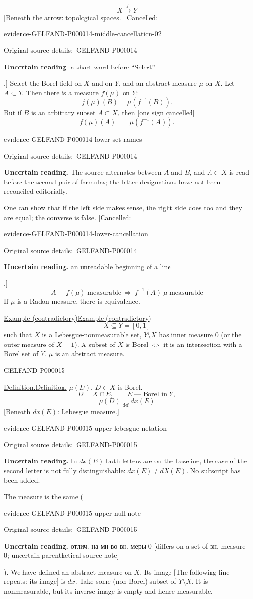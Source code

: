 \documentclass[11pt]{article}
\let\MathUnderline\underline
\renewcommand{\underline}[1]{\ifmmode\MathUnderline{#1}\else\uline{#1}\fi}
\newcommand{\SourcePage}[2]{\par\smallskip\phantomsection\label{#1:source-page}{\small\sffamily\color{blue!55!black}#1}\par\smallskip}
\newcommand{\EvidenceBlock}[4]{%
 \par\smallskip\noindent\begin{minipage}{\linewidth}
 \begin{minipage}[t]{.47\linewidth}\vspace{0pt}\centering
 \csname evidence-#1-#2\endcsname\par
 {\scriptsize\SourceCropCaption\ #1}\par
 \end{minipage}\hfill
 \begin{minipage}[t]{.49\linewidth}\vspace{0pt}\raggedright
 {\small\color{orange!65!black}\textbf{#4} #3}\par
 \end{minipage}
 \end{minipage}\par\smallskip}
\newcommand{\Unclear}[3]{\EvidenceBlock{#1}{#2}{#3}{\ReadingCaption}}
\newcommand{\SourceCropCaption}{Original source details:}\newcommand{\ReadingCaption}{Uncertain reading.}\newcommand{\IncompleteCaption}{Undeciphered passage.}\newcommand{\DiagramCaption}{Diagram and typed description.}
\begin{document}
\begin{equation*}
X\overset f\longrightarrow Y
\end{equation*}
[Beneath the arrow: topological spaces.]
[Cancelled: \Unclear{GELFAND-P000014}{middle-cancellation-02}{a short word before “Select”}.]
Select the Borel field on $X$ and on $Y$, and an abstract measure $\mu$ on $X$.
Let $A\subset Y$.
Then there is a measure $f(\mu)$ on $Y$:
\begin{equation*}
f(\mu)(B)=\mu(f^{-1}(B)).
\end{equation*}
But if $B$ is an arbitrary subset $A\subset X$, then [one sign cancelled]
\begin{equation*}
f(\mu)(A)\qquad \mu(f^{-1}(A)).
\end{equation*}
\Unclear{GELFAND-P000014}{lower-set-names}{The source alternates between $A$ and $B$, and $A\subset X$ is read before the second pair of formulas; the letter designations have not been reconciled editorially.}
One can show that if the left side makes sense, the right side does too and they are equal; the converse is false.
[Cancelled: \Unclear{GELFAND-P000014}{lower-cancellation}{an unreadable beginning of a line}.]
\begin{equation*}
A\ \text{---}\ f(\mu)\text{-measurable}\ \Longrightarrow\ f^{-1}(A)\ \mu\text{-measurable}
\end{equation*}
If $\mu$ is a Radon measure, there is equivalence.

\underline{Example (contradictory)}
\begin{equation*}
X\subseteq Y=[0,1]
\end{equation*}
such that $X$ is a Lebesgue-nonmeasurable set,
$Y\setminus X$ has inner measure $0$ (or the outer measure of $X=1$).
A subset of $X$ is Borel $\Longleftrightarrow$ it is an intersection with a Borel set of $Y$.
$\mu$ is an abstract measure.


\SourcePage{GELFAND-P000015}{8}
\underline{Definition.} $\mu(D)$.
$D\subset X$ is Borel.
\begin{equation*}
D=X\cap E,\qquad E\ \text{--- Borel in }Y,
\end{equation*}
\begin{equation*}
\mu(D)\underset{\mathrm{def}}=dx(E)
\end{equation*}
[Beneath $dx(E)$: Lebesgue measure.]
\Unclear{GELFAND-P000015}{upper-lebesgue-notation}{In $dx(E)$ both letters are on the baseline; the case of the second letter is not fully distinguishable: $dx(E)$ / $dX(E)$. No subscript has been added.}
The measure is the same (\Unclear{GELFAND-P000015}{upper-null-note}{отлич. на мн-во вн. меры 0 [differs on a set of вн. measure 0; uncertain parenthetical source note]}).
We have defined an abstract measure on $X$. Its image
[The following line repeats: its image] is $dx$.
Take some (non-Borel) subset of $Y\setminus X$.
It is nonmeasurable, but its inverse image is empty and hence measurable.
\end{document}

